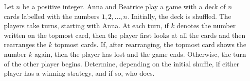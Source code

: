 Let $n$ be a positive integer.
Anna and Beatrice play a game with a deck of $n$ cards labelled with the numbers $1,2,\dots,n$.
Initially, the deck is shuffled.
The players take turns, starting with Anna.
At each turn, if $k$ denotes the number written on the topmost card, then the player first looks at all the cards and then rearranges the $k$ topmost cards.
If, after rearranging, the topmost card shows the number $k$ again, then the player has lost and the game ends.
Otherwise, the turn of the other player begins.
Determine, depending on the initial shuffle, if either player has a winning strategy, and if so, who does.

